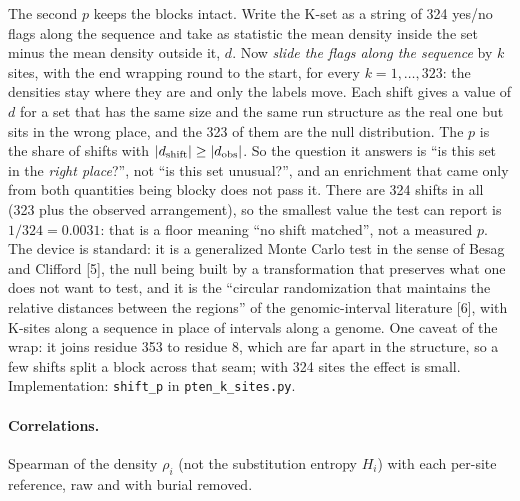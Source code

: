 \documentclass[11pt,a4paper]{article}
\newcommand{\file}[1]{\texttt{#1}}
\begin{document}
The second $p$ keeps the blocks intact. Write the K-set as a string of 324
yes/no flags along the sequence and take as statistic the mean density inside
the set minus the mean density outside it, $d$. Now \emph{slide the flags
along the sequence} by $k$ sites, with the end wrapping round to the start, for
every $k = 1,\dots,323$: the densities stay where they are and only the labels
move. Each shift gives a value of $d$ for a set that has the same size and the
same run structure as the real one but sits in the wrong place, and the 323 of
them are the null distribution. The $p$ is the share of shifts with
$|d_{\rm shift}| \ge |d_{\rm obs}|$. So the question it answers is ``is this
set in the \emph{right place}?'', not ``is this set unusual?'', and an
enrichment that came only from both quantities being blocky does not pass it.
There are 324 shifts in all (323 plus the observed arrangement), so the
smallest value the test can report is $1/324 = 0.0031$: that is a floor
meaning ``no shift matched'', not a measured $p$. The device is standard: it
is a generalized Monte Carlo test in the sense of Besag and Clifford [5], the
null being built by a transformation that preserves what one does not want to
test, and it is the ``circular randomization that maintains the relative
distances between the regions'' of the genomic-interval literature [6], with
K-sites along a sequence in place of intervals along a genome. One caveat of the wrap: it
joins residue 353 to residue 8, which are far apart in the structure, so a few
shifts split a block across that seam; with 324 sites the effect is small.
Implementation: \texttt{shift\_p} in \file{pten\_k\_sites.py}.

\paragraph{Correlations.} Spearman of the density $\rho_i$ (not the
substitution entropy $H_i$) with each per-site reference, raw and with burial
removed.
\end{document}
